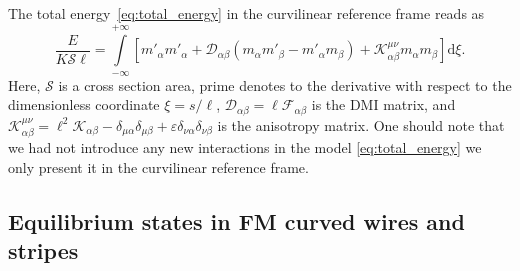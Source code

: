 The total energy~\eqref{eq:total_energy} in the curvilinear reference frame reads as
\begin{equation}\label{eq:totalEnergy_FrenetSerret}
\frac{E}{K\mathcal{S}\ell}=\int\limits_{-\infty}^{+\infty}\left[m'_\alpha m'_\alpha+\mathcal{D}_{\alpha\beta}\left(m_\alpha m'_\beta - m'_\alpha m_\beta\right)+\mathcal{K}^{\mu\nu}_{\alpha\beta}m_\alpha m_\beta\right]\mathrm{d}\xi.
\end{equation}
Here, $\mathcal{S}$ is a cross section area, prime denotes to the derivative with respect to the dimensionless coordinate $\xi=s/\ell$, $\mathcal{D}_{\alpha\beta}=\ell\mathcal{F}_{\alpha\beta}$ is the DMI matrix, and $\mathcal{K}^{\mu\nu}_{\alpha\beta}=\ell^2\mathcal{K}_{\alpha\beta}-\delta_{\mu\alpha}\delta_{\mu\beta}+\varepsilon\delta_{\nu\alpha}\delta_{\nu\beta}$ is the anisotropy matrix. One should note that we had not introduce any new interactions in the model \eqref{eq:total_energy} we only present it in the curvilinear reference frame.

\subsection{Equilibrium states in FM curved wires and stripes}\label{sec:statics}

